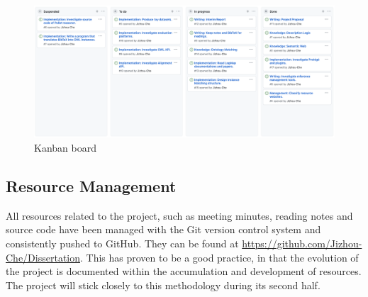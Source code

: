 \begin{figure}[ht]
\includegraphics[width=\textwidth]{img/Kanban.png}
\caption{Kanban board}
\label{fig:Kanban}
\end{figure}

\subsection{Resource Management}
All resources related to the project, such as meeting minutes, reading notes and source code have been managed with the Git version control system and consistently pushed to GitHub. They can be found at \url{https://github.com/Jizhou-Che/Dissertation}. This has proven to be a good practice, in that the evolution of the project is documented within the accumulation and development of resources. The project will stick closely to this methodology during its second half.

